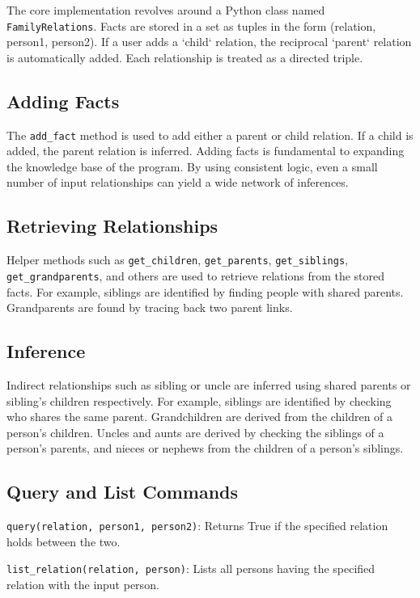 \documentclass[a4paper, journal]{IEEEtran}
\begin{document}
The core implementation revolves around a Python class named \texttt{FamilyRelations}. Facts are stored in a set as tuples in the form (relation, person1, person2). If a user adds a `child` relation, the reciprocal `parent` relation is automatically added. Each relationship is treated as a directed triple.

\subsection{Adding Facts}

The \texttt{add\_fact} method is used to add either a parent or child relation. If a child is added, the parent relation is inferred. Adding facts is fundamental to expanding the knowledge base of the program. By using consistent logic, even a small number of input relationships can yield a wide network of inferences.

\subsection{Retrieving Relationships}

Helper methods such as \texttt{get\_children}, \texttt{get\_parents}, \texttt{get\_siblings}, \texttt{get\_grandparents}, and others are used to retrieve relations from the stored facts. For example, siblings are identified by finding people with shared parents. Grandparents are found by tracing back two parent links.

\subsection{Inference}

Indirect relationships such as sibling or uncle are inferred using shared parents or sibling's children respectively. For example, siblings are identified by checking who shares the same parent. Grandchildren are derived from the children of a person's children. Uncles and aunts are derived by checking the siblings of a person's parents, and nieces or nephews from the children of a person's siblings.

\subsection{Query and List Commands}

\texttt{query(relation, person1, person2)}: Returns True if the specified relation holds between the two.

\texttt{list\_relation(relation, person)}: Lists all persons having the specified relation with the input person.
\end{document}
